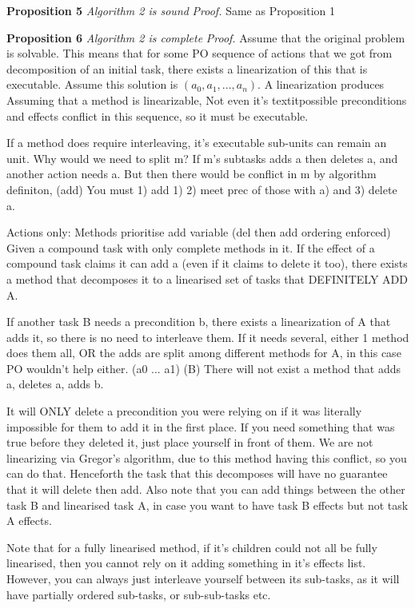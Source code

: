 \textbf{Proposition 5} \textit {Algorithm 2 is sound} \newline
\textit{Proof.} Same as Proposition 1

\textbf{Proposition 6} \textit {Algorithm 2 is complete} \newline
\textit{Proof.}
Assume that the original problem is solvable. This means that for some PO sequence of actions that we got from decomposition of an initial task, there exists a linearization of this that is executable. Assume this solution is $(a_0, a_1, ..., a_n)$. 
A linearization produces
Assuming that a method is linearizable, 
Not even it's textit{possible} preconditions and effects conflict in this sequence, so it must be executable.

If a method does require interleaving, it's executable sub-units can remain an unit.
Why would we need to split m? If m's subtasks adds a then deletes a, and another action needs a. But then there would be conflict in m
by algorithm definiton, (add)
You must 1) add 1) 2) meet prec of those with a) and 3) delete a.


Actions only:  
Methods prioritise add variable (del then add ordering enforced)
Given a compound task with only complete methods in it. 
If the effect of a compound task claims it can add a (even if it claims to delete it too), there exists a method that decomposes it to a linearised set of tasks that DEFINITELY ADD A. 

If another task B needs a precondition b, there exists a linearization of A that adds it, so there is no need to interleave them.
If it needs several, either 1 method does them all, OR the adds are split among different methods for A, in this case PO wouldn't help either.
(a0 ... a1) (B)
There will not exist a method that adds a, deletes a, adds b.

It will ONLY delete a precondition you were relying on if it was literally impossible for them to add it in the first place.
If you need something that was true before they deleted it, just place yourself in front of them. We are not linearizing via Gregor's algorithm, due to this method having this conflict, so you can do that. Henceforth the task that this decomposes will have no guarantee that it will delete then add.
Also note that you can add things between the other task B and linearised task A, in case you want to have task B effects but not task A effects.


Note that for a fully linearised method, if it's children could not all be fully linearised,
then you cannot rely on it adding something in it's effects list. However, you can always just interleave yourself between its sub-tasks, as it will have partially ordered sub-tasks, or sub-sub-tasks etc.
 
